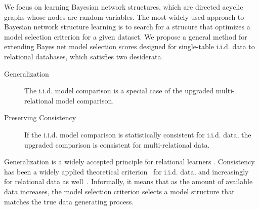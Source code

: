 \documentclass[letterpaper]{article}
\begin{document}
We focus on learning Bayesian network structures, which are directed acyclic graphs whose nodes are random variables.
The most widely used approach to Bayesian network structure learning is to search for a strucure that optimizes a model selection criterion for a given dataset. We propose a general method for extending Bayes net model selection scores designed for single-table i.i.d. data to relational databases, which satisfies two desiderata.

\begin{description}
\item[Generalization] The i.i.d. model comparison is a special case of the upgraded multi-relational model comparison.
\item[Preserving Consistency] If the i.i.d. model comparison is statistically consistent for i.i.d. data, the upgraded comparison is consistent for multi-relational data.
\end{description}

Generalization is a widely accepted principle for relational learners \cite{Ch.10deraedt,Knobbe2006}. 
%
Consistency has been a widely applied theoretical criterion~\cite{Williams2001} for i.i.d. data, and increasingly for relational data as well~\cite{Sakai2013,Xiang2011,Shalizi2013}.
Informally, it means that as the amount of available data increases, the model selection criterion selects a 
model structure that matches the true data generating process. 
\end{document}
